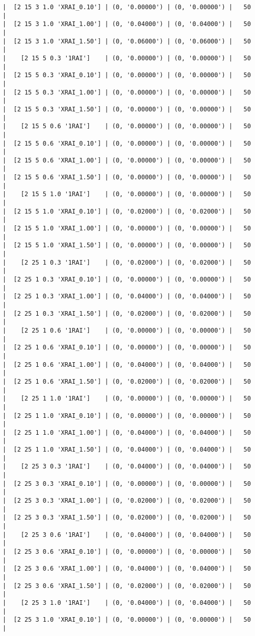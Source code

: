 \documentclass{article}
\begin{document}
\begin{verbatim}
|  [2 15 3 1.0 'XRAI_0.10'] | (0, '0.00000') | (0, '0.00000') |   50  |
|  [2 15 3 1.0 'XRAI_1.00'] | (0, '0.04000') | (0, '0.04000') |   50  |
|  [2 15 3 1.0 'XRAI_1.50'] | (0, '0.06000') | (0, '0.06000') |   50  |
|    [2 15 5 0.3 '1RAI']    | (0, '0.00000') | (0, '0.00000') |   50  |
|  [2 15 5 0.3 'XRAI_0.10'] | (0, '0.00000') | (0, '0.00000') |   50  |
|  [2 15 5 0.3 'XRAI_1.00'] | (0, '0.00000') | (0, '0.00000') |   50  |
|  [2 15 5 0.3 'XRAI_1.50'] | (0, '0.00000') | (0, '0.00000') |   50  |
|    [2 15 5 0.6 '1RAI']    | (0, '0.00000') | (0, '0.00000') |   50  |
|  [2 15 5 0.6 'XRAI_0.10'] | (0, '0.00000') | (0, '0.00000') |   50  |
|  [2 15 5 0.6 'XRAI_1.00'] | (0, '0.00000') | (0, '0.00000') |   50  |
|  [2 15 5 0.6 'XRAI_1.50'] | (0, '0.00000') | (0, '0.00000') |   50  |
|    [2 15 5 1.0 '1RAI']    | (0, '0.00000') | (0, '0.00000') |   50  |
|  [2 15 5 1.0 'XRAI_0.10'] | (0, '0.02000') | (0, '0.02000') |   50  |
|  [2 15 5 1.0 'XRAI_1.00'] | (0, '0.00000') | (0, '0.00000') |   50  |
|  [2 15 5 1.0 'XRAI_1.50'] | (0, '0.00000') | (0, '0.00000') |   50  |
|    [2 25 1 0.3 '1RAI']    | (0, '0.02000') | (0, '0.02000') |   50  |
|  [2 25 1 0.3 'XRAI_0.10'] | (0, '0.00000') | (0, '0.00000') |   50  |
|  [2 25 1 0.3 'XRAI_1.00'] | (0, '0.04000') | (0, '0.04000') |   50  |
|  [2 25 1 0.3 'XRAI_1.50'] | (0, '0.02000') | (0, '0.02000') |   50  |
|    [2 25 1 0.6 '1RAI']    | (0, '0.00000') | (0, '0.00000') |   50  |
|  [2 25 1 0.6 'XRAI_0.10'] | (0, '0.00000') | (0, '0.00000') |   50  |
|  [2 25 1 0.6 'XRAI_1.00'] | (0, '0.04000') | (0, '0.04000') |   50  |
|  [2 25 1 0.6 'XRAI_1.50'] | (0, '0.02000') | (0, '0.02000') |   50  |
|    [2 25 1 1.0 '1RAI']    | (0, '0.00000') | (0, '0.00000') |   50  |
|  [2 25 1 1.0 'XRAI_0.10'] | (0, '0.00000') | (0, '0.00000') |   50  |
|  [2 25 1 1.0 'XRAI_1.00'] | (0, '0.04000') | (0, '0.04000') |   50  |
|  [2 25 1 1.0 'XRAI_1.50'] | (0, '0.04000') | (0, '0.04000') |   50  |
|    [2 25 3 0.3 '1RAI']    | (0, '0.04000') | (0, '0.04000') |   50  |
|  [2 25 3 0.3 'XRAI_0.10'] | (0, '0.00000') | (0, '0.00000') |   50  |
|  [2 25 3 0.3 'XRAI_1.00'] | (0, '0.02000') | (0, '0.02000') |   50  |
|  [2 25 3 0.3 'XRAI_1.50'] | (0, '0.02000') | (0, '0.02000') |   50  |
|    [2 25 3 0.6 '1RAI']    | (0, '0.04000') | (0, '0.04000') |   50  |
|  [2 25 3 0.6 'XRAI_0.10'] | (0, '0.00000') | (0, '0.00000') |   50  |
|  [2 25 3 0.6 'XRAI_1.00'] | (0, '0.04000') | (0, '0.04000') |   50  |
|  [2 25 3 0.6 'XRAI_1.50'] | (0, '0.02000') | (0, '0.02000') |   50  |
|    [2 25 3 1.0 '1RAI']    | (0, '0.04000') | (0, '0.04000') |   50  |
|  [2 25 3 1.0 'XRAI_0.10'] | (0, '0.00000') | (0, '0.00000') |   50  |

\end{verbatim}
\end{document}
